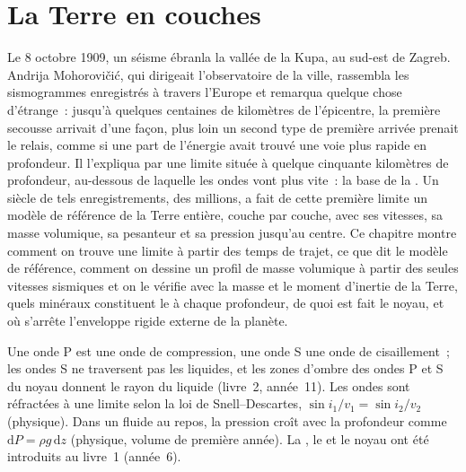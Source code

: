 \chapter{La Terre en couches}\label{ch:b1:layered-earth}

Le 8 octobre 1909, un séisme ébranla la vallée de la Kupa, au sud-est de Zagreb.
Andrija Mohorovičić, qui dirigeait l'observatoire de la ville, rassembla les
sismogrammes enregistrés à travers l'Europe et remarqua quelque chose d'étrange~:
jusqu'à quelques centaines de kilomètres de l'épicentre, la première secousse
arrivait d'une façon, plus loin un second type de première arrivée prenait le
relais, comme si une part de l'énergie avait trouvé une voie plus rapide en
profondeur. Il l'expliqua par une limite située à quelque cinquante kilomètres de
profondeur, au-dessous de laquelle les ondes vont plus vite~: la base de la
. Un siècle de tels enregistrements, des millions, a fait de cette première
limite un modèle de référence de la Terre entière, couche par couche, avec ses
vitesses, sa masse volumique, sa pesanteur et sa pression jusqu'au centre. Ce
chapitre montre comment on trouve une limite à partir des temps de trajet, ce que
dit le modèle de référence, comment on dessine un profil de masse volumique à
partir des seules vitesses sismiques et on le vérifie avec la masse et le moment
d'inertie de la Terre, quels minéraux constituent le  à chaque profondeur,
de quoi est fait le noyau, et où s'arrête l'enveloppe rigide externe de la
planète.

\begin{recall}
Une onde P est une onde de compression, une onde S une onde de cisaillement~; les
ondes S ne traversent pas les liquides, et les zones d'ombre des ondes P et S du
noyau donnent le rayon du  liquide (livre~2, année~11). Les ondes
sont réfractées à une limite selon la loi de Snell--Descartes,
$\sin i_1/v_1 = \sin i_2/v_2$ (physique). Dans un fluide au repos, la pression
croît avec la profondeur comme $\mathrm dP = \rho g\,\mathrm dz$ (physique, volume
de première année). La , le  et le noyau ont été introduits au
livre~1 (année~6).
\end{recall}


